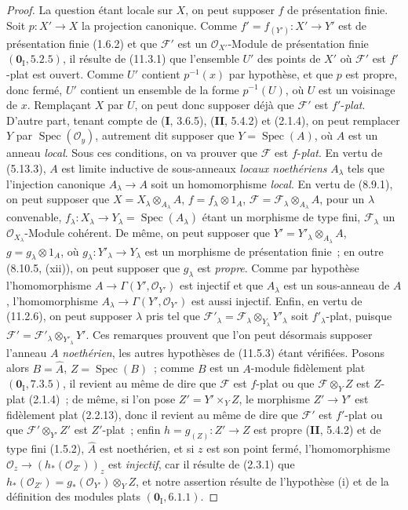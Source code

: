 \begin{proof}
La question étant locale sur $X$, on peut supposer $f$ de présentation finie.
Soit $p:X'\to X$ la projection canonique. Comme
$f'=f_{(Y')}:X'\to Y'$ est de présentation finie (1.6.2) et que $\mathcal F'$
est un $\mathcal O_{X'}$-Module de présentation finie
$(\mathbf 0_{\mathrm I},5.2.5)$, il résulte de (11.3.1) que l'ensemble $U'$ des
points de $X'$ où $\mathcal F'$ est $f'$-plat est ouvert. Comme $U'$ contient
$p^{-1}(x)$ par hypothèse, et que $p$ est propre, donc fermé, $U'$ contient un
ensemble de la forme $p^{-1}(U)$, où $U$ est un voisinage de $x$. Remplaçant $X$
par $U$, on peut donc supposer déjà que $\mathcal F'$ est $f'$-\emph{plat}.
D'autre part, tenant compte de (\textbf I, 3.6.5), (\textbf{II}, 5.4.2) et
(2.1.4), on peut remplacer $Y$ par $\operatorname{Spec}(\mathcal O_y)$,
autrement dit supposer que $Y=\operatorname{Spec}(A)$, où $A$ est un anneau
\emph{local}. Sous ces conditions, on va prouver que $\mathcal F$ est $f$-\emph{plat}. En
vertu de (5.13.3), $A$ est limite inductive de sous-anneaux \emph{locaux noethériens}
$A_\lambda$ tels que l'injection canonique $A_\lambda\to A$ soit un
homomorphisme \emph{local}. En vertu de (8.9.1), on peut supposer que
$X=X_\lambda\otimes_{A_\lambda}A$, $f=f_\lambda\otimes1_A$,
$\mathcal F=\mathcal F_\lambda\otimes_{A_\lambda}A$, pour un $\lambda$
convenable, $f_\lambda:X_\lambda\to Y_\lambda=\operatorname{Spec}(A_\lambda)$
étant un morphisme de type fini, $\mathcal F_\lambda$ un
$\mathcal O_{X_\lambda}$-Module cohérent. De même, on peut supposer que
$Y'=Y'_\lambda\otimes_{A_\lambda}A$, $g=g_\lambda\otimes1_A$, où
$g_\lambda:Y'_\lambda\to Y_\lambda$ est un morphisme de présentation finie~;
en outre (8.10.5, (xii)), on peut supposer que $g_\lambda$ est \emph{propre}. Comme par
hypothèse l'homomorphisme $A\to\Gamma(Y',\mathcal O_{Y'})$ est injectif et que
$A_\lambda$ est un sous-anneau de $A$, l'homomorphisme
$A_\lambda\to\Gamma(Y',\mathcal O_{Y'})$ est aussi injectif. Enfin, en vertu de
(11.2.6), on peut supposer $\lambda$ pris tel que
$\mathcal F'_\lambda=\mathcal F_\lambda\otimes_{Y_\lambda}Y'_\lambda$ soit
$f'_\lambda$-plat, puisque $\mathcal F'=\mathcal F'_\lambda\otimes_{Y'_\lambda}Y'$.
Ces remarques prouvent que l'on peut désormais supposer l'anneau $A$
\emph{noethérien}, les autres hypothèses de (11.5.3) étant vérifiées.
Posons alors $B=\widehat A$, $Z=\operatorname{Spec}(B)$~; comme $B$ est un
$A$-module fidèlement plat $(\mathbf 0_{\mathrm I},7.3.5)$, il revient au même
de dire que $\mathcal F$ est $f$-plat ou que $\mathcal F\otimes_Y Z$ est
$Z$-plat (2.1.4)~; de même, si l'on pose $Z'=Y'\times_Y Z$, le morphisme
$Z'\to Y'$ est fidèlement plat (2.2.13), donc il revient au même de dire que
$\mathcal F'$ est $f'$-plat ou que $\mathcal F'\otimes_{Y'}Z'$ est $Z'$-plat~;
enfin $h=g_{(Z)}:Z'\to Z$ est propre (\textbf{II}, 5.4.2) et de type fini
(1.5.2), $\widehat A$ est noethérien, et si $z$ est son point
fermé,
l'homomorphisme $\mathcal O_z\to(h_*(\mathcal O_{Z'}))_z$ est \emph{injectif}, car il
résulte de (2.3.1) que $h_*(\mathcal O_{Z'})=g_*(\mathcal O_{Y'})\otimes_Y Z$,
et notre assertion résulte de l'hypothèse (i) et de la définition des modules
plats $(\mathbf 0_{\mathrm I},6.1.1)$.


\end{proof}
